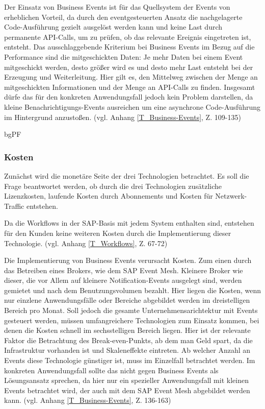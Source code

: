 Der Einsatz von Business Events ist für das Quellsystem der Events von erheblichen Vorteil, da durch den eventgesteuerten Ansatz die nachgelagerte Code-Ausführung gezielt ausgelöst werden kann und keine Last durch permanente API-Calls, um zu prüfen, ob das relevante Ereignis eingetreten ist, entsteht. Das ausschlaggebende Kriterium bei Business Events im Bezug auf die Performance sind die mitgeschickten Daten: Je mehr Daten bei einem Event mitgeschickt werden, desto grö{\ss}er wird es und desto mehr Last entsteht bei der Erzeugung und Weiterleitung. Hier gilt es, den Mittelweg zwischen der Menge an mitgeschickten Informationen und der Menge an API-Calls zu finden. Insgesamt dürfe das für den konkreten Anwendungsfall jedoch kein Problem darstellen, da kleine Benachrichtigungs-Events ausreichen um eine asynchrone Code-Ausführung im Hintergrund anzusto{\ss}en. (vgl. Anhang \ref{T_Business-Events}, Z. 109-135)

bgPF

\subsubsection{Kosten}

Zunächst wird die monetäre Seite der drei Technologien betrachtet. Es soll die Frage beantwortet werden, ob durch die drei Technologien zusätzliche Lizenzkosten, laufende Kosten durch Abonnements und Kosten für Netzwerk-Traffic entstehen. 

Da die Workflows in der SAP-Basis mit jedem System enthalten sind, entstehen für den Kunden keine weiteren Kosten durch die Implementierung dieser Technologie. (vgl. Anhang \ref{T_Workflows}, Z. 67-72)

Die Implementierung von Business Events verursacht Kosten. Zum einen durch das Betreiben eines Brokers, wie \zB dem SAP Event Mesh. Kleinere Broker wie dieser, die vor Allem auf kleinere Notification-Events ausgelegt sind, werden gemietet und nach dem Benutzungsvolumen bezahlt. Hier liegen die Kosten, wenn nur einzlene Anwendungsfälle oder Bereiche abgebildet werden im dreistelligen Bereich pro Monat. Soll jedoch die gesamte Unternehmensarichtektur mit Events gesteuert werden, müssen umfangreichere Technologien zum Einsatz kommen, bei denen die Kosten schnell im sechsstelligen Bereich liegen. Hier ist der relevante Faktor die Betrachtung des Break-even-Punkts, ab dem man Geld spart, da die Infrastruktur vorhanden ist und Skaleneffekte eintreten. Ab welcher Anzahl an Events diese Technologie günstiger ist, muss im Einzelfall betrachtet werden. Im konkreten Anwendungsfall sollte das nicht gegen Business Events als Lösungsansatz sprechen, da hier nur ein spezieller Anwendungsfall mit kleinen Events betrachtet wird, der auch mit dem SAP Event Mesh abgebildet werden kann. (vgl. Anhang \ref{T_Business-Events}, Z. 136-163)

